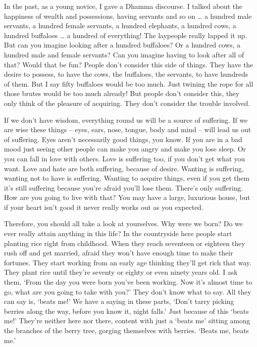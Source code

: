 In the past, as a young novice, I gave a Dhamma discourse. I talked about the happiness of wealth and possessions, having servants and so on \ldots{} a hundred male servants, a hundred female servants, a hundred elephants, a hundred cows, a hundred buffaloes \ldots{} a hundred of everything! The laypeople really lapped it up. But can you imagine looking after a hundred buffaloes? Or a hundred cows, a hundred male and female servants? Can you imagine having to look after all of that? Would that be fun? People don't consider this side of things. They have the desire to possess, to have the cows, the buffaloes, the servants, to have hundreds of them. But I say fifty buffaloes would be too much. Just twining the rope for all those brutes would be too much already! But people don't consider this, they only think of the pleasure of acquiring. They don't consider the trouble involved.

If we don't have wisdom, everything round us will be a source of suffering. If we are wise these things -- eyes, ears, nose, tongue, body and mind -- will lead us out of suffering. Eyes aren't necessarily good things, you know. If you are in a bad mood just seeing other people can make you angry and make you lose sleep. Or you can fall in love with others. Love is suffering too, if you don't get what you want. Love and hate are both suffering, because of desire. Wanting is suffering, wanting not to have is suffering. Wanting to acquire things, even if you get them it's still suffering because you're afraid you'll lose them. There's only suffering. How are you going to live with that? You may have a large, luxurious house, but if your heart isn't good it never really works out as you expected.

Therefore, you should all take a look at yourselves. Why were we born? Do we ever really attain anything in this life? In the countryside here people start planting rice right from childhood. When they reach seventeen or eighteen they rush off and get married, afraid they won't have enough time to make their fortunes. They start working from an early age thinking they'll get rich that way. They plant rice until they're seventy or eighty or even ninety years old. I ask them, `From the day you were born you've been working. Now it's almost time to go, what are you going to take with you?' They don't know what to say. All they can say is, `beats me!' We have a saying in these parts, `Don't tarry picking berries along the way, before you know it, night falls.' Just because of this `beats me!' They're neither here nor there, content with just a `beats me' sitting among the branches of the berry tree, gorging themselves with berries. `Beats me, beats me.'

